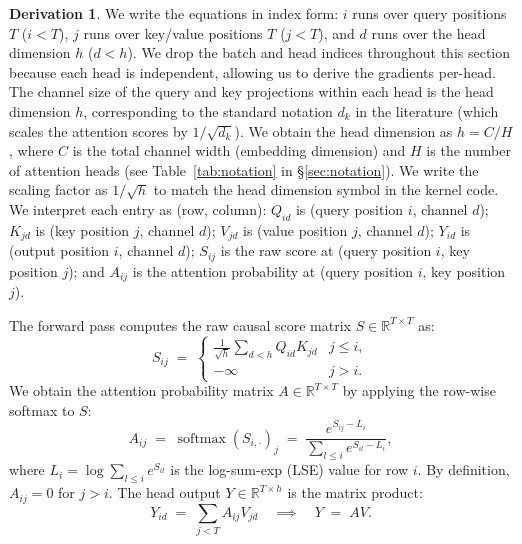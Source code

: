 \documentclass[letterpaper, 10 pt, conference]{ieeeconf}
\newcommand{\R}{\mathbb{R}}
\DeclareMathOperator{\softmax}{softmax}
\theoremstyle{definition}
\newtheorem*{derivation}{Derivation}
\begin{document}
\begin{derivation}
  We write the equations in index form: $i$ runs over query positions $T$ ($i < T$), $j$ runs over key/value positions $T$ ($j < T$), and $d$ runs over the head dimension $h$ ($d < h$). We drop the batch and head indices throughout this section because each head is independent, allowing us to derive the gradients per-head. The channel size of the query and key projections within each head is the head dimension $h$, corresponding to the standard notation $d_k$ in the literature (which scales the attention scores by $1/\sqrt{d_k}$). We obtain the head dimension as $h = C/H$, where $C$ is the total channel width (embedding dimension) and $H$ is the number of attention heads (see Table~\ref{tab:notation} in \S\ref{sec:notation}). We write the scaling factor as $1/\sqrt{h}$ to match the head dimension symbol in the kernel code. We interpret each entry as (row, column): $Q_{id}$ is (query position $i$, channel $d$); $K_{jd}$ is (key position $j$, channel $d$); $V_{jd}$ is (value position $j$, channel $d$); $Y_{id}$ is (output position $i$, channel $d$); $S_{ij}$ is the raw score at (query position $i$, key position $j$); and $A_{ij}$ is the attention probability at (query position $i$, key position $j$).

  The forward pass computes the raw causal score matrix $S \in \R^{T \times T}$ as:
  \begin{equation}
    S_{ij} \;=\; \begin{cases}
      \frac{1}{\sqrt{h}} \sum_{d<h} Q_{id} K_{jd} & j \leq i, \\
      -\infty                                     & j > i.
    \end{cases}
    \label{eq:att-score-fwd}
  \end{equation}
  We obtain the attention probability matrix $A \in \R^{T \times T}$ by applying the row-wise softmax to $S$:
  \begin{equation}
    A_{ij} \;=\; \softmax(S_{i,\cdot})_j \;=\; \frac{e^{S_{ij} - L_i}}{\sum_{l \leq i} e^{S_{il} - L_i}},
    \label{eq:att-prob-fwd}
  \end{equation}
  where $L_i = \log \sum_{l \leq i} e^{S_{il}}$ is the log-sum-exp (LSE) value for row $i$. By definition, $A_{ij} = 0$ for $j > i$. The head output $Y \in \R^{T \times h}$ is the matrix product:
  \begin{equation}
    Y_{id} \;=\; \sum_{j<T} A_{ij} V_{jd} \quad \implies \quad Y \;=\; A V.
    \label{eq:att-output-fwd}
  \end{equation}


\end{derivation}
\end{document}
